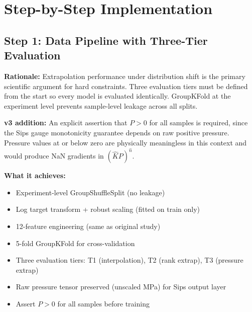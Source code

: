 \documentclass[12pt,a4paper]{article}
\begin{document}
\section{Step-by-Step Implementation}

\subsection{Step 1: Data Pipeline with Three-Tier Evaluation}

\begin{rationalebox}
\textbf{Rationale:} Extrapolation performance under distribution shift
is the primary scientific argument for hard constraints. Three evaluation
tiers must be defined from the start so every model is evaluated
identically. GroupKFold at the experiment level prevents sample-level
leakage across all splits.

\textbf{v3 addition:} An explicit assertion that $P > 0$ for all samples
is required, since the Sips gauge monotonicity guarantee depends on raw
positive pressure. Pressure values at or below zero are physically
meaningless in this context and would produce NaN gradients in
$(\hat{K} P)^{\hat{n}}$.
\end{rationalebox}

\begin{stepbox}
\textbf{What it achieves:}
\begin{itemize}[noitemsep]
  \item Experiment-level GroupShuffleSplit (no leakage)
  \item Log target transform + robust scaling (fitted on train only)
  \item 12-feature engineering (same as original study)
  \item 5-fold GroupKFold for cross-validation
  \item Three evaluation tiers: T1 (interpolation), T2 (rank extrap),
    T3 (pressure extrap)
  \item Raw pressure tensor preserved (unscaled MPa) for Sips output layer
  \item Assert $P > 0$ for all samples before training
\end{itemize}
\end{stepbox}
\end{document}
